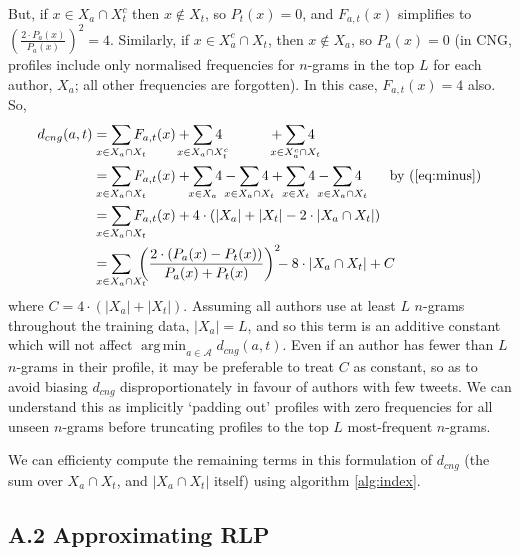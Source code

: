 \documentclass[twocolumn,10pt]{article}
\DeclareMathOperator*{\argmin}{arg\,min}
\begin{document}
But, if $x \in X_a \cap X_t^c$ then $x \notin X_t$, so $P_t(x) = 0$,
and $F_{a,t}(x)$ simplifies to
$\left(\frac{2\cdot P_a(x)}{P_a(x)}\right)^2 = 4$.
Similarly, if $x \in X_a^c \cap X_t$, then $x \notin X_a$, so $P_a(x) = 0$
(in CNG, profiles include only normalised frequencies for $n$-grams in
the top $L$ for each author, $X_a$; all other frequencies are forgotten).
In this case, $F_{a,t}(x) = 4$ also. So,
\begin{align*}
d_{cng}(a, t)
&=
    \smashoperator{\sum_{x \in X_a \cap X_t}}   F_{a,t}(x)
    +
    \smashoperator{\sum_{x \in X_a \cap X_t^c}} 4
    \hspace{3.3em} + 
    \smashoperator{\sum_{x \in X_a^c \cap X_t}} 4
\\
&=
    \smashoperator{\sum_{x \in X_a \cap X_t}}   F_{a,t}(x)
    + \smashoperator{\sum_{x \in X_a}}          4
    - \smashoperator{\sum_{x \in X_a \cap X_t}} 4
    + \smashoperator{\sum_{x \in X_t}}          4
    - \smashoperator{\sum_{x \in X_a \cap X_t}} 4
\tag*{by (\ref{eq:minus})}
\\
&=
    \smashoperator{\sum_{x \in X_a \cap X_t}}   F_{a,t}(x)
    + 4 \cdot (
          |X_a|
        + |X_t|
        - 2 \cdot |X_a \cap X_t|
    )
\\
&=
    \smashoperator{\sum_{x \in X_a \cap X_t}}\ 
        {\left ( \frac{2 \cdot (P_a(x) - P_t(x))}{P_a(x) + P_t(x)} \right )}^2
        \hspace{-1ex}
        - 8 \cdot |X_a \cap X_t| + C
\end{align*} 
where $C=4 \cdot (|X_a| + |X_t|)$. Assuming all authors use at least
$L$ $n$-grams throughout the training data, $|X_a| = L$, and so this
term is an additive constant which will not affect
$\argmin_{a\in\mathcal{A}}d_{cng}(a,t)$.
Even if an author has fewer than $L$ $n$-grams in their profile, it
may be preferable to treat $C$ as constant, so as to avoid biasing
$d_{cng}$ disproportionately in favour of authors with few tweets.
We can understand this as implicitly `padding out' profiles with
zero frequencies for all unseen $n$-grams before truncating profiles
to the top $L$ most-frequent $n$-grams. 

We can efficienty compute the remaining terms in this formulation
of $d_{cng}$ (the sum over $X_a \cap X_t$, and $|X_a \cap X_t|$
itself) using algorithm \ref{alg:index}.


\subsection*{A.2 Approximating RLP}
\label{A2}
\end{document}
